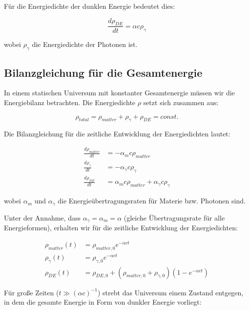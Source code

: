 \documentclass[a4paper,12pt]{article}
\begin{document}
Für die Energiedichte der dunklen Energie bedeutet dies:

\begin{equation}
	\frac{d\rho_{DE}}{dt} = \alpha c \rho_{\gamma}
\end{equation}

wobei $\rho_{\gamma}$ die Energiedichte der Photonen ist.

\subsection{Bilanzgleichung für die Gesamtenergie}

In einem statischen Universum mit konstanter Gesamtenergie müssen wir die Energiebilanz betrachten. Die Energiedichte $\rho$ setzt sich zusammen aus:

\begin{equation}
	\rho_{total} = \rho_{matter} + \rho_{\gamma} + \rho_{DE} = const.
\end{equation}

Die Bilanzgleichung für die zeitliche Entwicklung der Energiedichten lautet:

\begin{align}
	\frac{d\rho_{matter}}{dt} &= -\alpha_{m} c \rho_{matter} \\
	\frac{d\rho_{\gamma}}{dt} &= -\alpha_{\gamma} c \rho_{\gamma} \\
	\frac{d\rho_{DE}}{dt} &= \alpha_{m} c \rho_{matter} + \alpha_{\gamma} c \rho_{\gamma}
\end{align}

wobei $\alpha_{m}$ und $\alpha_{\gamma}$ die Energieübertragungsraten für Materie bzw. Photonen sind.

Unter der Annahme, dass $\alpha_{\gamma} = \alpha_{m} = \alpha$ (gleiche Übertragungsrate für alle Energieformen), erhalten wir für die zeitliche Entwicklung der Energiedichten:

\begin{align}
	\rho_{matter}(t) &= \rho_{matter,0} e^{-\alpha c t} \\
	\rho_{\gamma}(t) &= \rho_{\gamma,0} e^{-\alpha c t} \\
	\rho_{DE}(t) &= \rho_{DE,0} + (\rho_{matter,0} + \rho_{\gamma,0})(1 - e^{-\alpha c t})
\end{align}

Für große Zeiten ($t \gg (\alpha c)^{-1}$) strebt das Universum einem Zustand entgegen, in dem die gesamte Energie in Form von dunkler Energie vorliegt:
\end{document}
